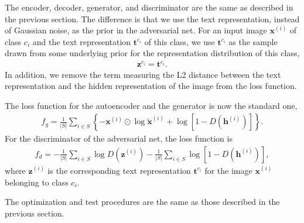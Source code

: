 \documentclass{article}
\newcommand{\bb}[1]{\boldsymbol{#1}}
\begin{document}
	The encoder, decoder, generator, and discriminator are the same as described in the previous section. The difference is that we use the text representation, instead of Gaussian noise, as the prior in the adversarial net. For an input image $\bb{x}^{(i)}$ of class $c_i$ and the text representation $\bb{t}^{c_i}$ of this class, we use $\bb{t}^{c_i}$ as the sample drawn from some underlying prior for the representation distribution of this class,
	\begin{align}
		\bb{z}^{c_i} = \bb{t}^{c_i}.
	\end{align}
	In addition, we remove the term measuring the L2 distance between the text representation and the hidden representation of the image from the loss function.

	The loss function for the autoencoder and the generator is now the standard one,
	\begin{align}
		f_g = \frac{1}{|S|} \sum_{i \in S} \left\{ -\bb{x}^{(i)} \odot \log \tilde{\bb{x}}^{(i)} + \log\left[ 1 - D( \bb{h}^{(i)} ) \right] \right\}.
	\end{align}
	For the discriminator of the adversarial net, the loss function is
	\begin{align}
		f_d = -\frac{1}{|S|} \sum_{i \in S} \log D( \bb{z}^{(i)} ) - \frac{1}{|S|} \sum_{i \in S} \log\left[ 1 - D( \bb{h}^{(i)} ) \right],
	\end{align}
	where $\bb{z}^{(i)}$ is the corresponding text representation $\bb{t}^{c_i}$ for the image $\bb{x}^{(i)}$ belonging to class $c_i$.
	
	The optimization and test procedures are the same as those described in the previous section.





%
%
\end{document}
